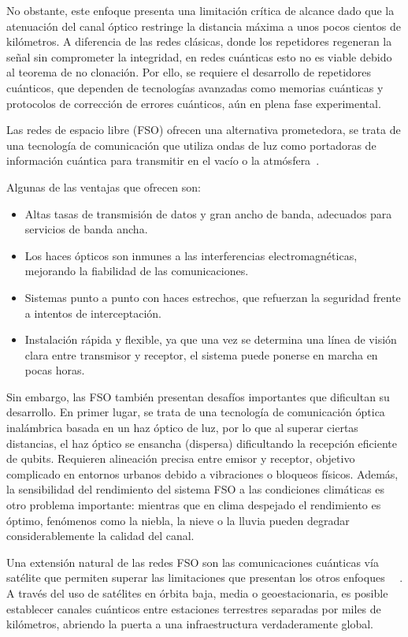 No obstante, este enfoque presenta una limitación crítica de alcance dado que la atenuación del canal óptico restringe la distancia máxima a unos pocos cientos de kilómetros. A diferencia de las redes clásicas, donde los repetidores regeneran la señal sin comprometer la integridad, en redes cuánticas esto no es viable debido al teorema de no clonación. Por ello, se requiere el desarrollo de repetidores cuánticos, que dependen de tecnologías avanzadas como memorias cuánticas y protocolos de corrección de errores cuánticos, aún en plena fase experimental.

Las redes de espacio libre (FSO) ofrecen una alternativa prometedora, se trata de una tecnología de comunicación que utiliza ondas de luz como portadoras de información cuántica para transmitir en el vacío o la atmósfera~\cite{Son2016}.

Algunas de las ventajas que ofrecen son:
\begin{itemize}
    \item Altas tasas de transmisión de datos y gran ancho de banda, adecuados para servicios de banda ancha.
    \item Los haces ópticos son inmunes a las interferencias electromagnéticas, mejorando la fiabilidad de las comunicaciones.
    \item Sistemas punto a punto con haces estrechos, que refuerzan la seguridad frente a intentos de interceptación.
    \item Instalación rápida y flexible, ya que una vez se determina una línea de visión clara entre transmisor y receptor, el sistema puede ponerse en marcha en pocas horas.
\end{itemize}

Sin embargo, las FSO también presentan desafíos importantes que dificultan su desarrollo. En primer lugar, se trata de una tecnología de comunicación óptica inalámbrica basada en un haz óptico de luz, por lo que al superar ciertas distancias, el haz óptico se ensancha (dispersa) dificultando la recepción eficiente de qubits. Requieren alineación precisa entre emisor y receptor, objetivo complicado en entornos urbanos debido a vibraciones o bloqueos físicos. Además, la sensibilidad del rendimiento del sistema FSO a las condiciones climáticas es otro problema importante: mientras que en clima despejado el rendimiento es óptimo, fenómenos como la niebla, la nieve o la lluvia pueden degradar considerablemente la calidad del canal.

Una extensión natural de las redes FSO son las comunicaciones cuánticas vía satélite que permiten superar las limitaciones que presentan los otros enfoques ~\cite{Calderaro2018}~\cite{Goswami2025}. A través del uso de satélites en órbita baja, media o geoestacionaria, es posible establecer canales cuánticos entre estaciones terrestres separadas por miles de kilómetros, abriendo la puerta a una infraestructura verdaderamente global.


